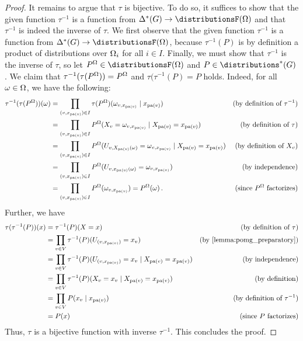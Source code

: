\documentclass[USenglish,onecolumn]{article}
\begin{document}
\begin{proof}
  It remains to argue that $\tau$ is bijective.
  To do so, it suffices to show that the given function $\tau^{-1}$ is a function from $\Delta^*(G)\to\distributionsF(\Omg)$ and that $\tau^{-1}$ is indeed the inverse of $\tau$.
  We first observe that the given function $\tau^{-1}$ is a function from $\Delta^*(G)\to\distributionsF(\Omg)$, because $\tau^{-1}(P)$ is by definition a product of distributions over $\Omega_i$ for all $i\in I$.
  Finally, we must show that $\tau^{-1}$ is the inverse of $\tau$, so let $P^\Omg\in\distributionsF(\Omg)$ and $P \in\distributions^*(G)$.
  We claim that $\tau^{-1}(\tau(P^\Omega))=P^\Omega$ and $\tau(\tau^{-1}(P)=P$ holds.
  Indeed, for all $\omega\in\Omega$, we have the following:
  \begin{align*}
    \tau^{-1}(\tau(P^\Omega))(\omega)
    &=
    \prod_{(v,x_{\text{pa}(v)})\in I} \tau(P^\Omega)(\omega_{v,x_{\text{pa}(v)}}\mid x_{\text{pa}(v)})
    &\text{(by definition of $\tau^{-1}$)}
    \\
    &=
    \prod_{(v,x_{\text{pa}(v)})\in I} P^{\Omega}(X_v=\omega_{v,x_{\text{pa}(v)}}\mid X_{\text{pa}(v)}=x_{\text{pa}(v)})
    &\text{(by definition of $\tau$)}
    \\
    &=
    \prod_{(v,x_{\text{pa}(v)})\in I} P^{\Omega}(U_{v,X_{\text{pa}(v)}(\omega)}=\omega_{v,x_{\text{pa}(v)}}\mid X_{\text{pa}(v)}=x_{\text{pa}(v)})
    &\text{(by definition of $X_v$)}
    \\
    &=
    \prod_{(v,x_{\text{pa}(v)})\in I} P^{\Omega}(U_{v,x_{\text{pa}(v)}(\omega)}=\omega_{v,x_{\text{pa}(v)}})
    &\text{(by independence)}
    \\
    &=\prod_{(v,x_{\text{pa}(v)})\in I} P^{\Omega}(\omega_{v,x_{\text{pa}(v)}})=P^\Omega(\omega)\,.
    &\text{(since $P^\Omega$ factorizes)}
  \end{align*}
Further, we have
  \begin{align*}
    \tau(\tau^{-1}(P))(x)
    &=\tau^{-1}(P)(X=x)
    &\text{(by definition of $\tau$)}
    \\
    &= \prod_\vinV \tau^{-1}(P)(U_\vxpav=x_{v})&\text{(by \Cref{lemma:pomg_preparatory})}\\ 
    &= \prod_\vinV \tau^{-1}(P)(U_\vxpav=x_{v} \given X_\pav = \xpav) &\text{(by independence)}\\ 
    &= \prod_\vinV \tau^{-1}(P)(X_{v} =x_{v} \given X_\pav = \xpav) &\text{(by definition)}\\ 
    &= \prod_\vinV P(x_v\given \xpav)&\text{(by definition of $\tau^{-1}$)}\\
    &= P(x) &\text{(since $P$ factorizes)}
    \end{align*}
  Thus, $\tau$ is a bijective function with inverse $\tau^{-1}$. This concludes the proof. 
\end{proof}
\end{document}
